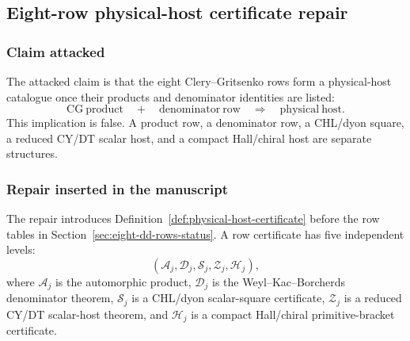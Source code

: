 \subsection{\texorpdfstring{Eight-row physical-host certificate repair}
{Eight-row physical-host certificate repair}}

\subsubsection*{Claim attacked}

The attacked claim is that the eight Clery--Gritsenko rows form a
physical-host catalogue once their products and denominator identities
are listed:
\[
\mathrm{CG\ product}
\quad+\quad
\mathrm{denominator\ row}
\quad\Longrightarrow\quad
\mathrm{physical\ host}.
\]
This implication is false.  A product row, a denominator row, a
CHL/dyon square, a reduced CY/DT scalar host, and a compact Hall/chiral
host are separate structures.

\subsubsection*{Repair inserted in the manuscript}

The repair introduces Definition~\ref{def:physical-host-certificate}
before the row tables in Section~\ref{sec:eight-dd-rows-status}.  A row
certificate has five independent levels:
\[
(\mathscr A_j,\mathscr D_j,\mathscr S_j,\mathscr Z_j,\mathscr H_j),
\]
where \(\mathscr A_j\) is the automorphic product,
\(\mathscr D_j\) is the Weyl--Kac--Borcherds denominator theorem,
\(\mathscr S_j\) is a CHL/dyon scalar-square certificate,
\(\mathscr Z_j\) is a reduced CY/DT scalar-host theorem, and
\(\mathscr H_j\) is a compact Hall/chiral primitive-bracket
certificate.

